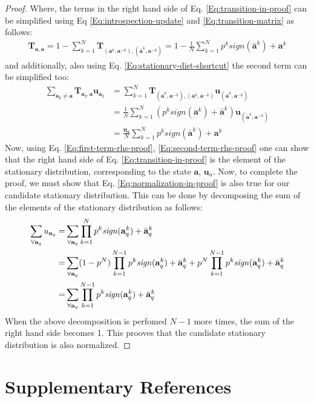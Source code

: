 \documentclass[11pt]{article}
\theoremstyle{plainCl1}
\theoremstyle{plainCl2}
\newcommand{\abf}{\mathbf{a}}
\newcommand{\T}{\mathbf{T}}
\newcommand{\ubf}{\mathbf{u}}
\begin{document}
\begin{proof}
Where, the terms in the right hand side of Eq. \ref{Eq:transition-in-proof} can be simplified using Eq \ref{Eq:introspection-update} and \ref{Eq:transition-matrix} as follows:
\begin{eqnarray}
\T_{\abf,\abf} = 1 - \sum_{k=1}^{N} \T_{(\abf^k, \abf^{-k}), (\bar{\abf}^k,\abf^{-k})} = 1 - \frac{1}{N} \sum_{k=1}^{N} p^k \textit{sign}(\bar{\abf}^k) + \abf^k 
\label{Eq:first-term-rhs-proof}
\end{eqnarray} 
and additionally, also using Eq. \ref{Eq:stationary-dist-shortcut} the second term can be simplified too:
\begin{align}
\sum_{\abf_q \neq \abf} \T_{\abf_q, \abf} \ubf_{\abf_q} &= \sum_{k = 1}^N \T_{(\bar{\abf}^k,\abf^{-k}), (\abf^k, \abf^{-k})} \ubf_{(\bar{\abf}^k,\abf^{-k})} \\
&= \frac{1}{N} \sum_{k = 1}^N \left(p^k \textit{sign}(\abf^k) + \bar{\abf}^k \right) \ubf_{(\bar{\abf}^k,\abf^{-k})} \\ 
\label{Eq:second-term-rhs-proof}
&= \frac{\ubf_\abf}{N} \sum_{k=1}^{N} p^k \textit{sign}(\bar{\abf}^k) + \abf^k 
\end{align}
Now, using Eq. \ref{Eq:first-term-rhs-proof}, \ref{Eq:second-term-rhs-proof} one can show that the right hand side of Eq. \ref{Eq:transition-in-proof} is the element of the stationary distribution, corresponding to the state $\abf$, $\ubf_a$.  Now, to complete the proof, we must show that Eq. \ref{Eq:normalization-in-proof} is also true for our candidate stationary distribution. This can be done by decomposing the sum of the elements of the stationary distribution as follows:
\begin{eqnarray}
\sum_{\forall \abf_q} u_{\abf_q} =& \displaystyle \sum_{\forall \abf_q} \prod_{k=1}^N p^k \mathit{sign}(\abf_q^k) + \bar{\abf}_q^k \\
=& \displaystyle \displaystyle \sum_{\forall \abf_q} (1-p^N)  \prod_{k=1}^{N-1} p^k \mathit{sign}(\abf_q^k) + \bar{\abf}_q^k  + p^N  \prod_{k=1}^{N-1} p^k \mathit{sign}(\abf_q^k) + \bar{\abf}_q^k \\ 
=& \displaystyle \sum_{\forall \abf_q} \prod_{k=1}^{N-1} p^k \mathit{sign}(\abf_q^k) + \bar{\abf}_q^k
\end{eqnarray}
When the above decomposition is perfomed $N-1$ more times, the sum of the right hand side becomes 1. This prooves that the candidate stationary distribution is also normalized. 
\end{proof}


\section*{Supplementary References}


\end{document}
